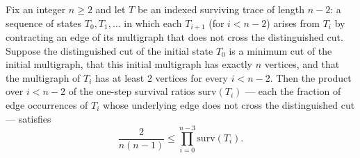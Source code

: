 \begin{theorem}
\label{KargerTrace.survivingTrace_edgeChoice_survival_product_lower_bound}
\leanok
{}
Fix an integer $n \ge 2$ and let $T$ be an indexed surviving trace of length $n-2$: a
sequence of states $T_0, T_1, \dots$ in which each $T_{i+1}$ (for $i < n-2$) arises from
$T_i$ by contracting an edge of its multigraph that does not cross the distinguished
cut. Suppose the distinguished cut of the initial state $T_0$ is a minimum cut of the
initial multigraph, that this initial multigraph has exactly $n$ vertices, and that the
multigraph of $T_i$ has at least $2$ vertices for every $i < n-2$. Then the product over
$i < n-2$ of the one-step survival ratios $\mathrm{surv}(T_i)$ — each the fraction of
edge occurrences of $T_i$ whose underlying edge does not cross the distinguished cut —
satisfies \[ \frac{2}{n(n-1)} \le \prod_{i=0}^{n-3} \mathrm{surv}(T_i). \]
\end{theorem}
